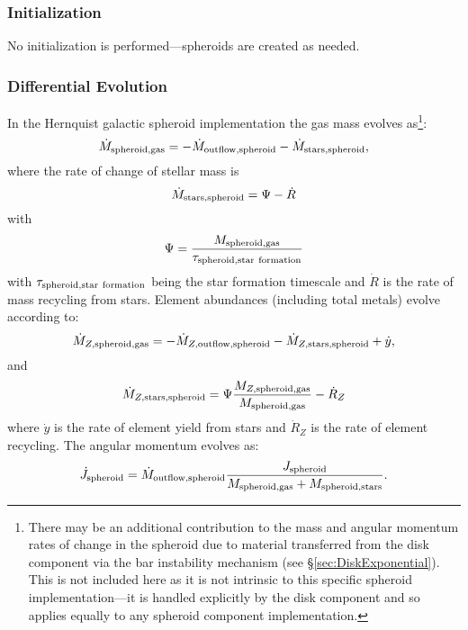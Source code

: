 \subsubsection{Initialization}

No initialization is performed---spheroids are created as needed.

\subsubsection{Differential Evolution}

In the Hernquist galactic spheroid implementation the gas mass evolves as\footnote{There may be an additional contribution to the mass and angular momentum rates of change in the spheroid due to material transferred from the disk component via the bar instability mechanism (see \S\protect\ref{sec:DiskExponential}). This is not included here as it is not intrinsic to this specific spheroid implementation---it is handled explicitly by the disk component and so applies equally to any spheroid component implementation.}:
\begin{equation}
 \dot{M}_{\rm spheroid, gas} = - \dot{M}_{\rm outflow, spheroid} - \dot{M}_{\rm stars, spheroid},
\end{equation}
where the rate of change of stellar mass is
\begin{equation}
 \dot{M}_{\rm stars, spheroid} = \Psi - \dot{R}
\end{equation}
with
\begin{equation}
 \Psi = {M_{\rm spheroid, gas} \over \tau_{\rm spheroid, star~formation}}
\end{equation}
with $\tau_{\rm spheroid, star~formation}$ being the star formation timescale and $\dot{R}$ is the rate of mass recycling from stars.
Element abundances (including total metals) evolve according to:
\begin{equation}
  \dot{M}_{Z, {\rm spheroid, gas}} = - \dot{M}_{Z, {\rm outflow, spheroid}} - \dot{M}_{Z, {\rm stars, spheroid}} + \dot{y},
\end{equation}
and
\begin{equation}
 \dot{M}_{Z, {\rm stars, spheroid}} = \Psi {M_{Z, {\rm spheroid, gas}} \over M_{\rm spheroid, gas}} - \dot{R}_Z
\end{equation}
where $\dot{y}$ is the rate of element yield from stars and $\dot{R}_Z$ is the rate of element recycling. The angular momentum evolves as:
\begin{equation}
 \dot{J}_{\rm spheroid} = \dot{M}_{\rm outflow, spheroid} {J_{\rm spheroid} \over M_{\rm spheroid, gas} + M_{\rm spheroid, stars}}.
\end{equation}
